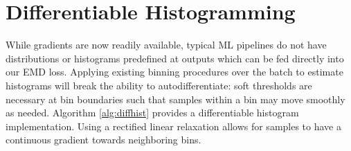 \section{Differentiable Histogramming}\label{sec:supphist}
\iffalse
\begin{algorithm}
\caption{Differentiable Histograms}\label{alg:diffhist}
\begin{algorithmic}[1] \footnotesize
\Function {Init}{$n$} {\em \hspace*{\fill} // bins, (discretization)}
    \State $r := 1/n$ {\em \hspace*{\fill} // bin size}
    \State $locs := arange(0, 1, r)$ {\em \hspace*{\fill} // bin boundaries}
\EndFunction
\Function {Forward}{$acts$}
    \State $cdfs = \sigma(acts)$ {\em \hspace*{\fill} // compute CDFs}
    \State $counts = []$
    \For{loc in locs}
        \State $dist = \lvert cdfs - loc \rvert$ {\em \hspace*{\fill} // dist. to boundary}
        \State $ct = \underset{i\in[nbins]}{\sum} \operatorname{ReLU}(r - dist[i])$ {\em \hspace*{\fill} // soft bucket count}
        \State $counts.append(ct)$
    \EndFor
    \State $out = stack(counts)$
    \State $out = out/sum(out)$
    \State \Return $out$
\EndFunction
\end{algorithmic}
\end{algorithm}
\fi

While gradients are now readily available, typical ML pipelines do not have distributions or histograms predefined at outputs which can be fed directly into 
our EMD loss. Applying existing binning procedures over the batch to estimate histograms will break the ability to autodifferentiate: soft thresholds are necessary at bin boundaries such that samples within a bin may move smoothly as needed. Algorithm \ref{alg:diffhist} provides a differentiable histogram implementation. Using a rectified linear relaxation allows for samples to have a continuous gradient towards neighboring bins.